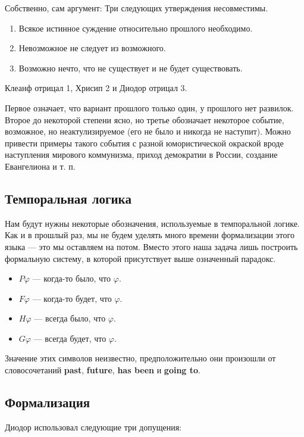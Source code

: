 \documentclass[openany]{book}
\theoremstyle{plain}
\theoremstyle{definition}
\begin{document}
Собственно, сам аргумент:
Три следующих утверждения несовместимы.
\begin{enumerate}
\item Всякое истинное суждение относительно прошлого необходимо.
\item Невозможное не следует из возможного.
\item Возможно нечто, что не существует и не будет существовать.
\end{enumerate}

Клеанф отрицал 1, Хрисип 2 и Диодор отрицал 3.

Первое означает, что вариант прошлого только один, у прошлого нет развилок. Второе до некоторой степени ясно, но третье обозначает некоторое событие, возможное, но неактулизируемое (его не было и никогда не наступит). Можно привести примеры такого события с разной юмористической окраской вроде наступления мирового коммунизма, приход демократии в России, создание Евангелиона и т. п.

\subsection{ Темпоральная логика }

Нам будут нужны некоторые обозначения, используемые в темпоральной логике. Как и в прошлый раз, мы не будем уделять много времени формализации этого языка — это мы оставляем на потом. Вместо этого наша задача лишь построить формальную систему, в которой присутствует выше означенный парадокс.

\begin{itemize}
\item \(P\varphi\) — когда-то было, что \(\varphi\).
\item \(F\varphi\) — когда-то будет, что \(\varphi\).
\item \(H\varphi\) — всегда было, что \(\varphi\).
\item \(G\varphi\) — всегда будет, что \(\varphi\).
\end{itemize}

Значение этих символов неизвестно, предположительно они произошли от словосочетаний \textbf{past}, \textbf{future}, \textbf{has been} и \textbf{going to}. 

\subsection{ Формализация }

Диодор использовал следующие три допущения:
\end{document}
